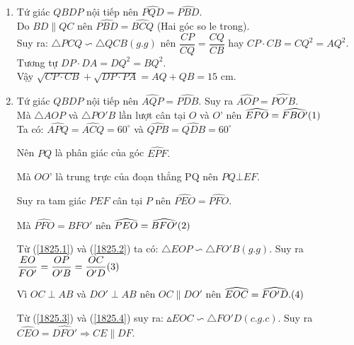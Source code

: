 \begin{ex}
{\begin{enumerate}
		\item Tứ giác $QBDP$  nội tiếp nên $\widehat{PQD}=\widehat{PBD}.$\\
		Do $BD \parallel QC$ nên $\widehat{PBD}=\widehat{BCQ}$ (Hai góc so le trong).\\
		Suy ra: $\triangle PCQ\backsim \triangle QCB(g.g)$ 
		nên $\dfrac{CP}{CQ}=\dfrac{CQ}{CB}$ hay $CP\cdot CB=CQ^2=AQ^2.$\\
		Tương tự $DP\cdot DA=DQ^2=BQ^2.$
\\
		Vậy $\sqrt{CP\cdot CB}+\sqrt{DP\cdot PA}=AQ+QB=15$ cm.

		
		
		\item Tứ giác $QBDP$  nội tiếp nên $\widehat{AQP}=\widehat{PDB}.$
Suy ra $\widehat{AOP}=\widehat{PO'B}.$ \\
Mà $\triangle AOP$ và $\triangle PO'B$ lần lượt cân tại $O$ và $O’$ nên 
		$\widehat{EPO}=\widehat{FBO'} \refstepcounter{equation}\hfill (\theequation)\label{1825.1}$
\\
		Ta có: $\widehat{APQ}=\widehat{ACQ}=60^{\circ }$ và $\widehat{QPB}=\widehat{QDB}=60^{\circ }$ 

		Nên $PQ$ là phân giác của góc $\widehat{EPF}.$

		Mà $OO’$ là trung trực của đoạn thẳng PQ nên $PQ\bot EF$.

		Suy ra tam giác $PEF$  cân tại $P$ nên $\widehat{PEO}=\widehat{PFO}.$

		Mà $\widehat{PFO}=\widehat{BFO'}$ nên 
$\widehat{PEO}=\widehat{BFO'}\refstepcounter{equation}\hfill (\theequation)\label{1825.2} $

		Từ (\ref{1825.1}) và (\ref{1825.2}) ta có: $\triangle EOP\backsim \triangle FO'B(g.g)$.
		Suy ra $\dfrac{EO}{FO'}=\dfrac{OP}{O'B}=\dfrac{OC}{O'D}\refstepcounter{equation}\hfill (\theequation)\label{1825.3}$

		Vì $OC \perp AB$ và $DO'\perp AB$ nên $OC\parallel DO'$ nên $\widehat{EOC}=\widehat{FO'D}.\refstepcounter{equation}\hfill (\theequation)\label{1825.4}$ 

		Từ (\ref{1825.3}) và (\ref{1825.4}) suy ra: $\vartriangle EOC\backsim \triangle FO'D(c.g.c)$. Suy ra $\widehat{CEO}=\widehat{DFO'} \Rightarrow CE \parallel DF.$
	\end{enumerate}
}
	\end{ex}
